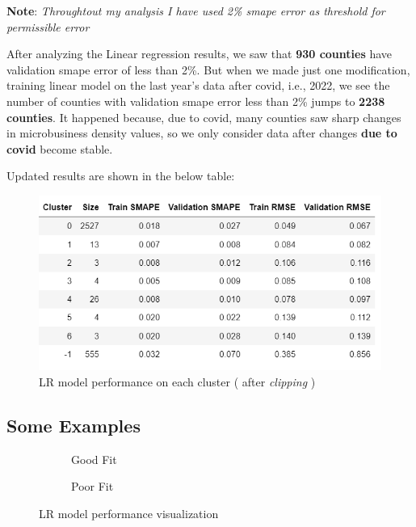 \documentclass{article}
\begin{document}
\textbf{Note}: \textit{Throughtout my analysis I have used 2\% smape error as threshold for permissible error} 

After analyzing the Linear regression results, we saw that \textbf{930 counties} have validation smape error of less than 2\%. But when we made just one modification, training linear model on the last year's data after covid, i.e., 2022, we see the number of counties with validation smape error less than 2\% jumps to \textbf{2238 counties}. It happened because, due to covid, many counties saw sharp changes in microbusiness density values, so we only consider data after changes \textbf{due to covid} become stable. 

\vspace{1em}
Updated results are shown in the below table: 

\begin{figure}[h]
	\centering
	\vspace{1em}
	\includegraphics{images/lr_results2}
	\caption{LR model performance on each cluster ( after \textit{clipping} )}
\end{figure}

\subsection{Some Examples}

\begin{figure}[h]
	\centering
	\vspace{1em}
	\begin{subfigure}{0.45\textwidth}
		\caption{Good Fit}
		\label{fig:lr_good}
	\end{subfigure}
	\begin{subfigure}{0.45\textwidth}
		\caption{Poor Fit}
		\label{fig:lr_poor}
	\end{subfigure}
	\caption{LR model performance visualization}
	\label{fig:lr_both}
\end{figure}
\end{document}
